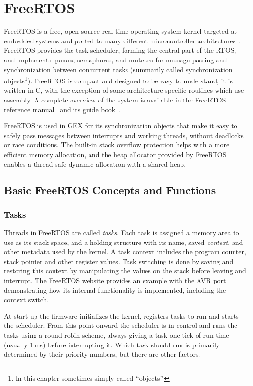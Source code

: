 \chapter{FreeRTOS} \label{sec:freertos}

FreeRTOS is a free, open-source real time operating system kernel targeted at embedded systems and ported to many different microcontroller architectures~\cite{freertos-ports-list}. FreeRTOS provides the task scheduler, forming the central part of the RTOS, and implements queues, semaphores, and mutexes for message passing and synchronization between concurrent tasks (summarily called synchronization objects\footnote{In this chapter sometimes simply called ``objects''.}). FreeRTOS is compact and designed to be easy to understand; it is written in C, with the exception of some architecture-specific routines which use assembly. A complete overview of the system is available in the FreeRTOS reference manual~\cite{freertos-rm} and its guide book~\cite{freertos-book}.

FreeRTOS is used in GEX for its synchronization objects that make it easy to safely pass messages between interrupts and working threads, without deadlocks or race conditions. The built-in stack overflow protection helps with a more efficient memory allocation, and the heap allocator provided by FreeRTOS enables a thread-safe dynamic allocation with a shared heap.

\section{Basic FreeRTOS Concepts and Functions}

\subsection{Tasks}

Threads in FreeRTOS are called \textit{tasks}. Each task is assigned a memory area to use as its stack space, and a holding structure with its name, saved \textit{context}, and other metadata used by the kernel. A task context includes the program counter, stack pointer and other register values. Task switching is done by saving and restoring this context by manipulating the values on the stack before leaving and interrupt. The FreeRTOS website provides an example with the AVR port~\cite{freertos-task-switching} demonstrating how its internal functionality is implemented, including the context switch.

At start-up the firmware initializes the kernel, registers tasks to run and starts the scheduler. From this point onward the scheduler is in control and runs the tasks using a round robin scheme, always giving a task one tick of run time (usually 1\,ms) before interrupting it. Which task should run is primarily determined by their priority numbers, but there are other factors.

